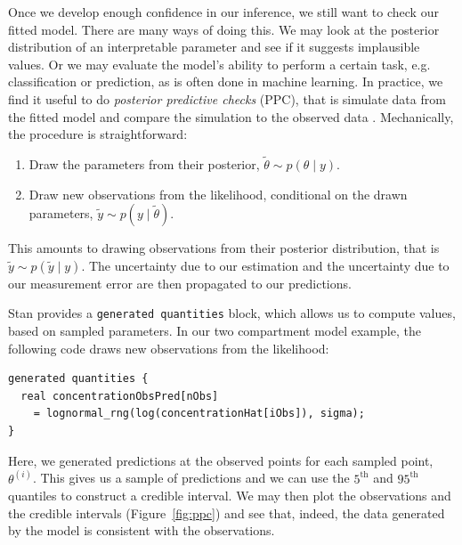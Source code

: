 Once we develop enough confidence in our inference, we still want to check our fitted model.
There are many ways of doing this.
We may look at the posterior distribution of an interpretable parameter and see if it suggests implausible values.
Or we may evaluate the model's ability to perform a certain task, e.g. classification or prediction, as is often done in machine learning.
In practice, we find it useful to do \textit{posterior predictive
  checks} (PPC), that is simulate data from the fitted model and compare the simulation to the observed data \cite[chapter 6]{Gelman:2013}.
%
Mechanically, the procedure is straightforward:
\begin{enumerate}
  \item Draw the parameters from their posterior, $\tilde \theta \sim p(\theta \mid y).$
  \item Draw new observations from the likelihood, conditional on the drawn parameters, $\tilde y \sim p(y \mid \tilde \theta)$.
\end{enumerate}
This amounts to drawing observations from their posterior distribution, that is $\tilde y \sim p(\tilde y \mid y)$.
The uncertainty due to our estimation and the uncertainty due to our measurement error are then propagated to our predictions.

Stan provides a \texttt{generated quantities} block, which allows us to compute values, based on sampled parameters.
In our two compartment model example, the following code draws new observations from the likelihood:
\begin{lstlisting}
generated quantities {
  real concentrationObsPred[nObs] 
    = lognormal_rng(log(concentrationHat[iObs]), sigma);
}
\end{lstlisting}
%
Here, we generated predictions at the observed points for each sampled point, $\theta^{(i)}$.
This gives us a sample of predictions and we can use the $5^\mathrm{th}$ and $95^\mathrm{th}$ quantiles to construct a credible interval.
We may then plot the observations and the credible intervals (Figure~\ref{fig:ppc}) and see that, indeed, the data generated by the model is consistent with the observations.
 

